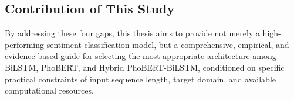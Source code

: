 \documentclass[12pt]{report} %
\begin{document}
\subsection*{Contribution of This Study}

By addressing these four gaps, this thesis aims to provide not merely a high-performing sentiment classification model, but a comprehensive, empirical, and evidence-based guide for selecting the most appropriate architecture among BiLSTM, PhoBERT, and Hybrid PhoBERT-BiLSTM, conditioned on specific practical constraints of input sequence length, target domain, and available computational resources.

\cleardoublepage
{}



\cleardoublepage
\appendix
{}
\setcounter{page}{1}
\end{document}
